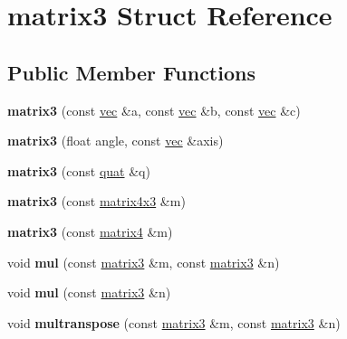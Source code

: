 \hypertarget{structmatrix3}{}\section{matrix3 Struct Reference}
\label{structmatrix3}
\subsection*{Public Member Functions}
\begin{DoxyCompactItemize}
\item 
\mbox{\label{structmatrix3_a03f292887de189b30e3edeebbaefd3dd}} 
{\bfseries matrix3} (const \hyperlink{structvec}{vec} \&a, const \hyperlink{structvec}{vec} \&b, const \hyperlink{structvec}{vec} \&c)
\item 
\mbox{\label{structmatrix3_ae61420183c85074d9183257939d73b9b}} 
{\bfseries matrix3} (float angle, const \hyperlink{structvec}{vec} \&axis)
\item 
\mbox{\label{structmatrix3_adf5911b389eec32d532b456e144f6b3b}} 
{\bfseries matrix3} (const \hyperlink{structquat}{quat} \&q)
\item 
\mbox{\label{structmatrix3_a51259bed4b6072cc14bdc0548a0abc82}} 
{\bfseries matrix3} (const \hyperlink{structmatrix4x3}{matrix4x3} \&m)
\item 
\mbox{\label{structmatrix3_a9319f5b5bd0d502f20794a932b467afd}} 
{\bfseries matrix3} (const \hyperlink{structmatrix4}{matrix4} \&m)
\item 
\mbox{\label{structmatrix3_aaa6e6bc655fcea204fcafddb92226317}} 
void {\bfseries mul} (const \hyperlink{structmatrix3}{matrix3} \&m, const \hyperlink{structmatrix3}{matrix3} \&n)
\item 
\mbox{\label{structmatrix3_ad5dd43298f53a9dc328345057d9c921c}} 
void {\bfseries mul} (const \hyperlink{structmatrix3}{matrix3} \&n)
\item 
\mbox{\label{structmatrix3_ad0e33ae2b78079da12c281def85f31e6}} 
void {\bfseries multranspose} (const \hyperlink{structmatrix3}{matrix3} \&m, const \hyperlink{structmatrix3}{matrix3} \&n)

\end{DoxyCompactItemize}
